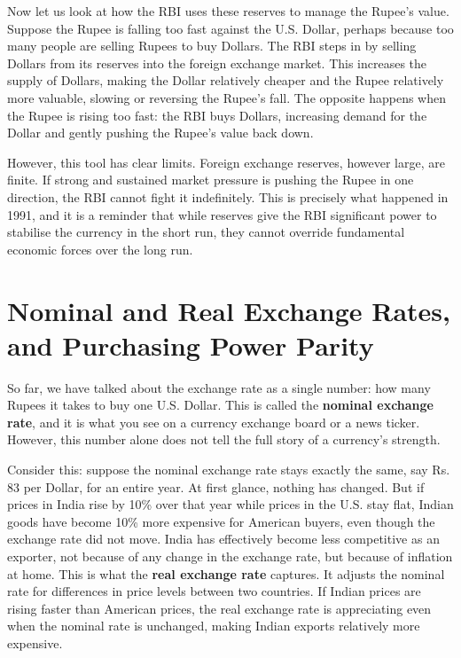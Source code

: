 \documentclass[12pt,a4paper]{article}
\begin{document}
Now let us look at how the RBI uses these reserves to manage the Rupee's value. Suppose the Rupee is falling too fast against the U.S. Dollar, perhaps because too many people are selling Rupees to buy Dollars. The RBI steps in by selling Dollars from its reserves into the foreign exchange market. This increases the supply of Dollars, making the Dollar relatively cheaper and the Rupee relatively more valuable, slowing or reversing the Rupee's fall. The opposite happens when the Rupee is rising too fast: the RBI buys Dollars, increasing demand for the Dollar and gently pushing the Rupee's value back down.

However, this tool has clear limits. Foreign exchange reserves, however large, are finite. If strong and sustained market pressure is pushing the Rupee in one direction, the RBI cannot fight it indefinitely. This is precisely what happened in 1991, and it is a reminder that while reserves give the RBI significant power to stabilise the currency in the short run, they cannot override fundamental economic forces over the long run.

\section*{Nominal and Real Exchange Rates, and Purchasing Power Parity}

So far, we have talked about the exchange rate as a single number: how many Rupees it takes to buy one U.S. Dollar. This is called the \textbf{nominal exchange rate}, and it is what you see on a currency exchange board or a news ticker. However, this number alone does not tell the full story of a currency's strength.

Consider this: suppose the nominal exchange rate stays exactly the same, say Rs.\,83 per Dollar, for an entire year. At first glance, nothing has changed. But if prices in India rise by 10\% over that year while prices in the U.S. stay flat, Indian goods have become 10\% more expensive for American buyers, even though the exchange rate did not move. India has effectively become less competitive as an exporter, not because of any change in the exchange rate, but because of inflation at home. This is what the \textbf{real exchange rate} captures. It adjusts the nominal rate for differences in price levels between two countries. If Indian prices are rising faster than American prices, the real exchange rate is appreciating even when the nominal rate is unchanged, making Indian exports relatively more expensive.
\end{document}
